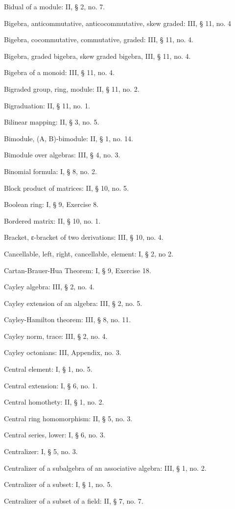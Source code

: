 Bidual of a module: II, § 2, no. 7.

Bigebra, anticommutative, anticocommutative, skew graded: III, § 11, no. 4

Bigebra, cocommutative, commutative, graded: III, § 11, no. 4.

Bigebra, graded bigebra, skew graded bigebra, III, § 11, no. 4.

Bigebra of a monoid: III, § 11, no. 4.

Bigraded group, ring, module: II, § 11, no. 2.

Bigraduation: II, § 11, no. 1.

Bilinear mapping: II, § 3, no. 5.

Bimodule, (A, B)-bimodule: II, § 1, no. 14.

Bimodule over algebras: III, § 4, no. 3.

Binomial formula: I, § 8, no. 2.

Block product of matrices: II, § 10, no. 5.

Boolean ring: I, § 9, Exercise 8.

Bordered matrix: II, § 10, no. 1.

Bracket, ε-bracket of two derivations: III, § 10, no. 4.

Cancellable, left, right, cancellable, element: I, § 2, no 2.

Cartan-Brauer-Hua Theorem: I, § 9, Exercise 18.

Cayley algebra: III, § 2, no. 4.

Cayley extension of an algebra: III, § 2, no. 5.

Cayley-Hamilton theorem: III, § 8, no. 11.

Cayley norm, trace: III, § 2, no. 4.

Cayley octonians: III, Appendix, no. 3.

Central element: I, § 1, no. 5.

Central extension: I, § 6, no. 1.

Central homothety: II, § 1, no. 2.

Central ring homomorphism: II, § 5, no. 3.

Central series, lower: I, § 6, no. 3.

Centralizer: I, § 5, no. 3.

Centralizer of a subalgebra of an associative algebra: III, § 1, no. 2.

Centralizer of a subset: I, § 1, no. 5.

Centralizer of a subset of a field: II, § 7, no. 7.

